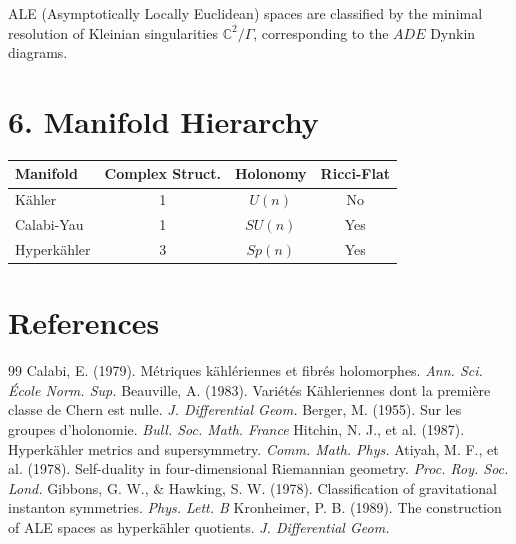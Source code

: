\documentclass{article}
\begin{document}
ALE (Asymptotically Locally Euclidean) spaces are classified by the minimal resolution of Kleinian singularities $\mathbb{C}^2/\Gamma$, corresponding to the $ADE$ Dynkin diagrams.


\section{6. Manifold Hierarchy}
\begin{table}[h!]
\centering
\begin{tabular}{lccc}
\toprule
\textbf{Manifold} & \textbf{Complex Struct.} & \textbf{Holonomy} & \textbf{Ricci-Flat} \\
\midrule
Kähler & 1 & $U(n)$ & No \\
Calabi-Yau & 1 & $SU(n)$ & Yes \\
Hyperkähler & 3 & $Sp(n)$ & Yes \\
\bottomrule
\end{tabular}
\end{table}

\section*{References}
\begin{thebibliography}{99}
 Calabi, E. (1979). Métriques kählériennes et fibrés holomorphes. \emph{Ann. Sci. École Norm. Sup.}
 Beauville, A. (1983). Variétés Kähleriennes dont la première classe de Chern est nulle. \emph{J. Differential Geom.}
 Berger, M. (1955). Sur les groupes d'holonomie. \emph{Bull. Soc. Math. France}
 Hitchin, N. J., et al. (1987). Hyperkähler metrics and supersymmetry. \emph{Comm. Math. Phys.}
 Atiyah, M. F., et al. (1978). Self-duality in four-dimensional Riemannian geometry. \emph{Proc. Roy. Soc. Lond.}
 Gibbons, G. W., \& Hawking, S. W. (1978). Classification of gravitational instanton symmetries. \emph{Phys. Lett. B}
 Kronheimer, P. B. (1989). The construction of ALE spaces as hyperkähler quotients. \emph{J. Differential Geom.}
\end{thebibliography}
\end{document}
